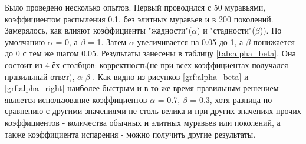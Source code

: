 \documentclass[12pt, a4paper]{report}
\begin{document}
    Было проведено несколько опытов. Первый проводился с 50 муравьями, коэффициентом распыления 0.1, без элитных муравьев и в 200 поколений. Замерялось, как влияют коэффициенты "жадности"($\alpha$) и "стадности"($\beta$)). По умолчанию $\alpha$ = 0, а $\beta$ = 1. Затем $\alpha$ увеличивается на 0.05 до 1, а $\beta$ понижается до 0 с тем же шагом 0.05. Результаты занесены в таблицу \ref{tab:alpha_beta}. Она состоит из 4-ёх столбцов: корректность(не при всех коэффициентах получался правильный ответ), $\alpha$ \text{,} $\beta$ . Как видно из рисунков \ref{grf:alpha_beta} и \ref{grf:alpha_right} наиболее быстрым и в то же время правильным решением является использование коэффициентов $\alpha$ = 0.7, $\beta$ = 0.3, хотя разница по сравнению с другими значениями не столь велика и  при других значениях прочих коэффициентов - количества обычных и элитных муравьев или поколений, а также коэффициента испарения - можно получить другие результаты.
    
    \newpage
    
\end{document}
